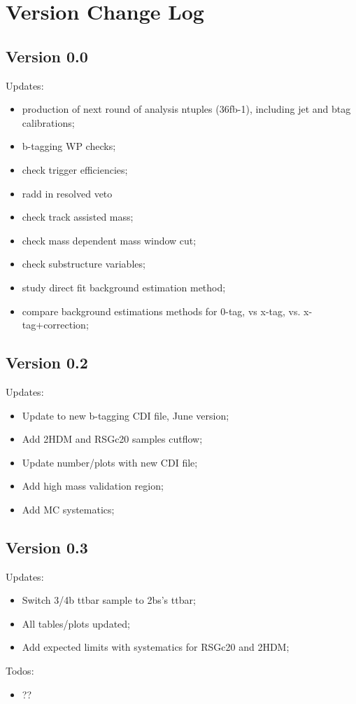 \section{Version Change Log}
\subsection{Version 0.0}
Updates:
\begin{itemize}
\item production of next round of analysis ntuples (36fb-1), including jet and btag calibrations; 
\item b-tagging WP checks; 
\item check trigger efficiencies; 
\item radd in resolved veto
\item check track assisted mass;
\item check mass dependent mass window cut;
\item check substructure variables; 
\item study direct fit background estimation method; 
\item compare background estimations methods for 0-tag, vs x-tag, vs. x-tag+correction; 
\end{itemize}


\subsection{Version 0.2}
Updates:
\begin{itemize}
	\item Update to new b-tagging CDI file, June version;
	\item Add 2HDM and RSGc20 samples cutflow; 
	\item Update number/plots with new CDI file; 
	\item Add high mass validation region; 
	\item Add \ttbar MC systematics; 
\end{itemize}

\subsection{Version 0.3}
Updates:
\begin{itemize}
	\item Switch 3/4b ttbar sample to 2bs's ttbar; 
	\item All tables/plots updated; 
	\item Add expected limits with systematics for RSGc20 and 2HDM;
\end{itemize}



Todos:
\begin{itemize}
	\item ??
\end{itemize}

\clearpage
